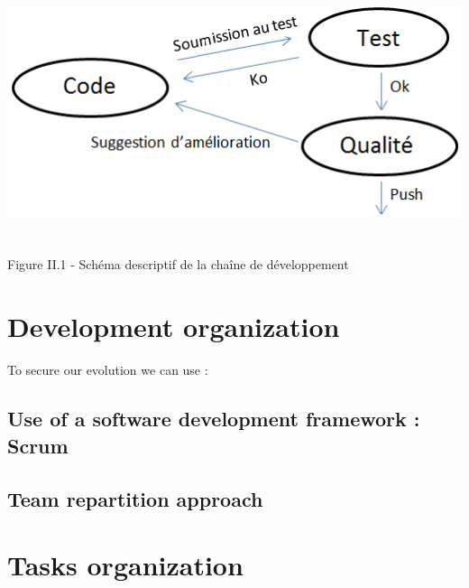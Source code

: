 \documentclass{report}
\begin{document}
\begin{center}
\includegraphics[scale=0.7]{data/cycle_qualite}
~\\~\\Figure II.1 - Sch\'{e}ma descriptif de la cha\^{i}ne de d\'{e}veloppement
\end{center}

\section{Development organization}

\paragraph{}
\hspace{4mm}\textnormal{To secure our evolution we can use :}

\subsection{Use of a software development framework : Scrum}

\paragraph{}
\hspace{4mm}\textnormal{}

\subsection{Team repartition approach}

\paragraph{}
\hspace{4mm}\textnormal{}

\section{Tasks organization}
\end{document}
